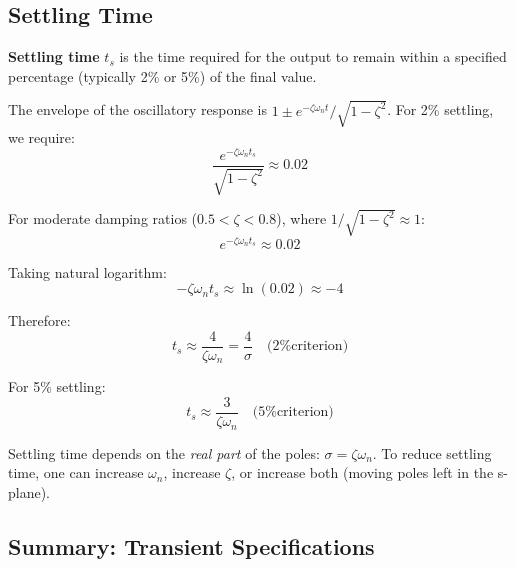 \subsection{Settling Time}

\textbf{Settling time} $t_s$ is the time required for the output to remain within a specified percentage (typically 2\% or 5\%) of the final value.

The envelope of the oscillatory response is $1 \pm e^{-\zeta\omega_n t}/\sqrt{1-\zeta^2}$. For 2\% settling, we require:
\begin{equation}
    \frac{e^{-\zeta\omega_n t_s}}{\sqrt{1-\zeta^2}} \approx 0.02
\end{equation}

For moderate damping ratios ($0.5 < \zeta < 0.8$), where $1/\sqrt{1-\zeta^2} \approx 1$:
\begin{equation}
    e^{-\zeta\omega_n t_s} \approx 0.02
\end{equation}

Taking natural logarithm:
\begin{equation}
    -\zeta\omega_n t_s \approx \ln(0.02) \approx -4
\end{equation}

Therefore:
\begin{equation}
    \boxed{t_s \approx \frac{4}{\zeta\omega_n} = \frac{4}{\sigma} \quad \text{(2\% criterion)}}
    \label{eq:settling_time_2}
\end{equation}

For 5\% settling:
\begin{equation}
    \boxed{t_s \approx \frac{3}{\zeta\omega_n} \quad \text{(5\% criterion)}}
    \label{eq:settling_time_5}
\end{equation}

\begin{keyconceptbox}
Settling time depends on the \textit{real part} of the poles: $\sigma = \zeta\omega_n$. To reduce settling time, one can increase $\omega_n$, increase $\zeta$, or increase both (moving poles left in the s-plane).
\end{keyconceptbox}

\subsection{Summary: Transient Specifications}

